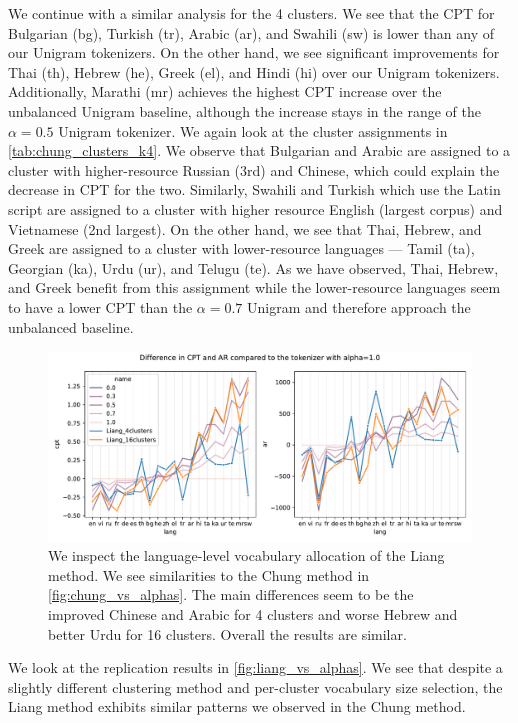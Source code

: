We continue with a similar analysis for the 4 clusters. We see that the CPT for Bulgarian (bg), Turkish (tr), Arabic (ar), and Swahili (sw) is lower than any of our Unigram tokenizers. On the other hand, we see significant improvements for Thai (th), Hebrew (he), Greek (el), and Hindi (hi) over our Unigram tokenizers. Additionally, Marathi (mr) achieves the highest CPT increase over the unbalanced Unigram baseline, although the increase stays in the range of the $\alpha=0.5$ Unigram tokenizer. We again look at the cluster assignments in \autoref{tab:chung_clusters_k4}. We observe that Bulgarian and Arabic are assigned to a cluster with higher-resource Russian (3rd) and Chinese, which could explain the decrease in CPT for the two. Similarly, Swahili and Turkish which use the Latin script are assigned to a cluster with higher resource English (largest corpus) and Vietnamese (2nd largest). On the other hand, we see that Thai, Hebrew, and Greek are assigned to a cluster with lower-resource languages --- Tamil (ta), Georgian (ka), Urdu (ur), and Telugu (te). As we have observed, Thai, Hebrew, and Greek benefit from this assignment while the lower-resource languages seem to have a lower CPT than the $\alpha=0.7$ Unigram and therefore approach the unbalanced baseline.

\begin{figure}[H]
    \centering
    \includegraphics[width=\textwidth]{figures/liang_vs_alphas.pdf}
    \caption{We inspect the language-level vocabulary allocation of the Liang method. We see similarities to the Chung method in \autoref{fig:chung_vs_alphas}. The main differences seem to be the improved Chinese and Arabic for 4 clusters and worse Hebrew and better Urdu for 16 clusters. Overall the results are similar.}
    \label{fig:liang_vs_alphas}
\end{figure}

We look at the \citet{liang_xlm-v_2023} replication results in \autoref{fig:liang_vs_alphas}. We see that despite a slightly different clustering method and per-cluster vocabulary size selection, the Liang method exhibits similar patterns we observed in the Chung method.

